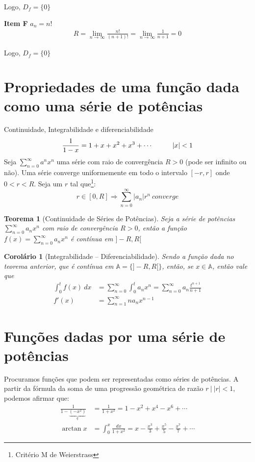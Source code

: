 \documentclass[12pt,openany, letterpaper]{book}
\newtheorem{theorem}{Teorema}[section]
\newtheorem{corollary}{Corolário}[theorem]
\newcommand{\LI}[1][n]{\lim_{{#1} \rightarrow \infty}}
\newcommand{\soma}[2][n]{\sum_{{#1} = #2}^\infty}
\newcommand{\cmw}{Critério M de Weierstrass }
\begin{document}
{{Logo, $D_f = \{0\}$ \vspace{5mm}

\textbf{Item F} $a_n = n!$
\begin{align*}
R = \LI \frac{n!}{(n+1)!} = \LI \frac{1}{n+1} = 0
\end{align*}

Logo, $D_f = \{0\}$

\section{Propriedades de uma função dada como uma série de potências}{Continuidade, Integrabilidade e diferenciabilidade}
$$\frac{1}{1-x}= 1 + x +x^2 + x^3 + \cdots \hspace{10mm} |x| < 1 $$
\hspace{5mm}Seja $\displaystyle{\soma{0} a^n x^n}$ uma série com raio de convergência $R > 0$ (pode ser infinito ou não). Uma série converge uniformemente em todo o intervalo $[-r,r]$ onde $0 < r < R$. Seja um $r$ tal que\footnote{\cmw}: $$r \in [0,R] \Rightarrow \soma{0}|a_n|r^n \ converge$$

\begin{theorem}[Continuidade de Séries de Potências]
Seja a série de potências $\displaystyle{\soma{0} a_n x^n}$ com raio de convergência $R > 0$, então a função $f(x) = \displaystyle{\soma{0} a_n x^n}$ é contínua em $]-R,R[$
\end{theorem}

\begin{corollary}[Integrabilidade -- Diferenciabilidade]
Sendo a função dada no teorema anterior, que é contínua em $\mathds{A} = \{]-R,R[\}$, então, se $x \in \mathds{A}$, então vale que \begin{align*}
\int_0^t f(x) \ dx &= \soma{0} \int_0^t a_n x^n = \soma{0} a_n \frac{t^{n+1}}{n+1} \\
f'(x) &= \soma{1} n a_n x^{n-1}
\end{align*}
\end{corollary}

\section{Funções dadas por uma série de potências}
\hspace{5mm} Procuramos funções que podem ser representadas como séries de potências. A partir da fórmula da soma de uma progressão geométrica de razão $r \ | \ |r| < 1$, podemos afirmar que: \begin{align*}
\frac{1}{1-\underbrace{(-x^2)}_q} &= \frac{1}{1+x^2} = 1 - x^2 + x^4 - x^6 + \cdots \\
\arctan x &= \int_0^x \frac{dx}{1+x^2} = x - \frac{x^3}{3} + \frac{x^5}{5} - \frac{x^7}{7} + \cdots
\end{align*}

}}
\end{document}
